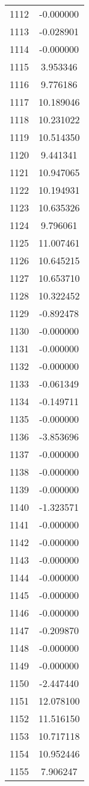 \documentclass[12pt]{article}
\begin{document}
\begin{longtable}{@{}cc@{}}
1112 & -0.000000 \\
1113 & -0.028901 \\
1114 & -0.000000 \\
1115 & 3.953346 \\
1116 & 9.776186 \\
1117 & 10.189046 \\
1118 & 10.231022 \\
1119 & 10.514350 \\
1120 & 9.441341 \\
1121 & 10.947065 \\
1122 & 10.194931 \\
1123 & 10.635326 \\
1124 & 9.796061 \\
1125 & 11.007461 \\
1126 & 10.645215 \\
1127 & 10.653710 \\
1128 & 10.322452 \\
1129 & -0.892478 \\
1130 & -0.000000 \\
1131 & -0.000000 \\
1132 & -0.000000 \\
1133 & -0.061349 \\
1134 & -0.149711 \\
1135 & -0.000000 \\
1136 & -3.853696 \\
1137 & -0.000000 \\
1138 & -0.000000 \\
1139 & -0.000000 \\
1140 & -1.323571 \\
1141 & -0.000000 \\
1142 & -0.000000 \\
1143 & -0.000000 \\
1144 & -0.000000 \\
1145 & -0.000000 \\
1146 & -0.000000 \\
1147 & -0.209870 \\
1148 & -0.000000 \\
1149 & -0.000000 \\
1150 & -2.447440 \\
1151 & 12.078100 \\
1152 & 11.516150 \\
1153 & 10.717118 \\
1154 & 10.952446 \\
1155 & 7.906247 \\

\end{longtable}
\end{document}
